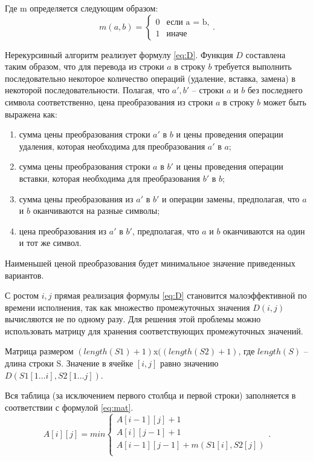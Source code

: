 Где m определяется следующим образом:
\begin{equation}
	\label{eq:m}
	m(a, b) = \begin{cases}
		0 &\text{если a = b,}\\
		1 &\text{иначе}
	\end{cases}.
\end{equation}

Нерекурсивный алгоритм реализует формулу \ref{eq:D}.
Функция $D$ составлена таким образом, что для перевода из строки $a$ в строку $b$ требуется выполнить последовательно некоторое количество операций (удаление, вставка, замена) в некоторой последовательности. Полагая, что $a', b'$  -- строки $a$ и $b$ без последнего символа соответственно, цена преобразования из строки $a$ в строку $b$ может быть выражена как:
\begin{enumerate}[label={\arabic*)}]
	\item сумма цены преобразования строки $a'$ в $b$ и цены проведения операции удаления, которая необходима для преобразования $a'$ в $a$;
	\item сумма цены преобразования строки $a$ в $b'$  и цены проведения операции вставки, которая необходима для преобразования $b'$ в $b$;
	\item сумма цены преобразования из $a'$ в $b'$ и операции замены, предполагая, что $a$ и $b$ оканчиваются на разные символы;
	\item цена преобразования из $a'$ в $b'$, предполагая, что $a$ и $b$ оканчиваются на один и тот же символ.
\end{enumerate}
Наименьшей ценой преобразования будет минимальное значение приведенных вариантов.

С ростом $i, j$ прямая реализация формулы \ref{eq:D} становится малоэффективной по времени исполнения, так как множество промежуточных значения $ D(i, j)$ вычисляются не по одному разу. Для решения этой проблемы можно использовать матрицу для хранения соответствующих промежуточных значений.

Матрица размером $(length(S1)+ 1)$x$((length(S2) + 1)$, где $length(S)$ -- длина строки S. Значение в ячейке $[i, j]$ равно значению $D(S1[1...i], S2[1...j])$.

Вся таблица (за исключением первого столбца и первой строки) заполняется в соответствии с формулой \ref{eq:mat}.
\begin{equation}
	\label{eq:mat}
	A[i][j] = min \begin{cases}
		A[i-1][j] + 1\\
		 A[i][j-1] + 1\\
		 A[i-1][j-1] + m(S1[i], S2[j])\\
	 \end{cases}.
 \end{equation}

